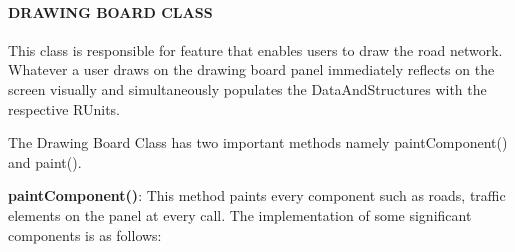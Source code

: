 \documentclass[11pt,a4paper]{article}
\begin{document}
  \paragraph{DRAWING BOARD CLASS}
  This class is responsible for feature that enables users to draw the
  road network. Whatever a user draws on the drawing board panel
  immediately reflects on the screen visually and simultaneously
  populates the DataAndStructures with the respective RUnits.
	
  The Drawing Board Class has two important methods namely
  paintComponent() and paint().
  
  \textbf{paintComponent()}:
  This method paints every component such as roads, traffic elements on
  the panel at every call. The implementation of some significant components is as follows:
  
\end{document}
